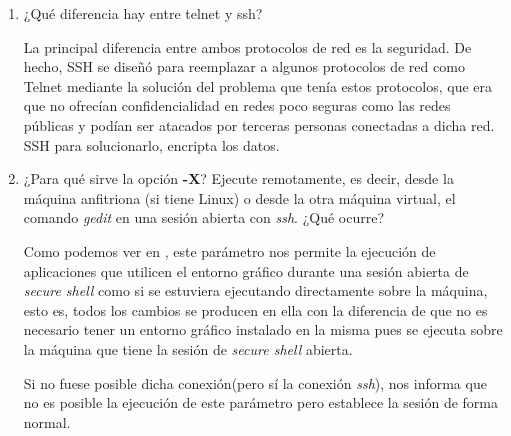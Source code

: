 \documentclass[paper=a4, fontsize=11pt]{scrartcl} %
\numberwithin{equation}{section} %
\numberwithin{figure}{section} %
\numberwithin{table}{section} %
\begin{document}
\begin{enumerate}
		De hecho, ambos servicios están colgados de forma abierta y permitiendo no sólo ver el código
		que utilizan si no también proponer cómo corregir un bug encontrado, reportarlo o simplemente
		crear nuestro propio gestor de paquetes basado en alguno de ellos\cite{oS_YaST_GitHub}
		\cite{oS_zypper_GitHub}.
		
		Ambos se distribuyen bajo la licencia \href{https://www.gnu.org/licenses/gpl.html}{\textbf{GPL}}
		\footnote{De hecho, creo que incluso utilizan la misma versión de dicha licencia.}.
	
	\section{Gestión de los cortafuegos(\textit{Firewalls})}
	\section{Instalación del servicio de acceso remoto a la consola(\textit{Secure Shell})}
		\item ¿Qué diferencia hay entre telnet y ssh?
		
		La principal diferencia entre ambos protocolos de red es la seguridad\cite{Telnet}\cite{SSH}.
		De hecho, SSH se diseñó para reemplazar a algunos protocolos de red como Telnet mediante
		la solución del problema que tenía estos protocolos, que era que no ofrecían confidencialidad
		en redes poco seguras como las redes públicas y podían ser atacados por terceras personas
		conectadas a dicha red. SSH para solucionarlo, encripta los datos.
	
		\item ¿Para qué sirve la opción \textbf{-X}? Ejecute remotamente, es decir, desde la máquina
		anfitriona (si tiene Linux) o desde la otra máquina virtual, el comando \textit{gedit} en una
		sesión abierta con \textit{ssh}. ¿Qué ocurre?
		
		Como podemos ver en \cite{man_SSH}, este parámetro nos permite la ejecución de aplicaciones
		que utilicen el entorno gráfico durante una sesión abierta de \textit{secure shell} como si
		se estuviera ejecutando directamente sobre la máquina, esto es, todos los cambios se producen
		en ella con la diferencia de que no es necesario tener un entorno gráfico instalado en la
		misma pues se ejecuta sobre la máquina que tiene la sesión de \textit{secure shell} abierta.
		
		Si no fuese posible dicha conexión(pero sí la conexión \textit{ssh}), nos informa que no es
		posible la ejecución de este parámetro pero establece la sesión de forma normal.
		

\end{enumerate}
\end{document}
